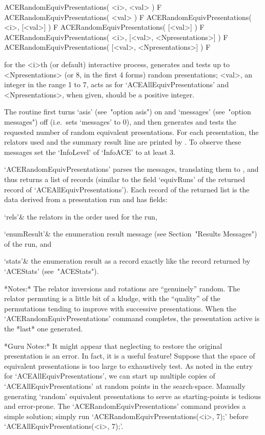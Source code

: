 \>ACERandomEquivPresentations( <i>, <val> ) F
\>ACERandomEquivPresentations( <val> ) F
\>ACERandomEquivPresentations( <i>, [<val>] ) F
\>ACERandomEquivPresentations( [<val>] ) F
\>ACERandomEquivPresentations( <i>, [<val>, <Npresentations>] ) F
\>ACERandomEquivPresentations( [<val>, <Npresentations>] ) F

for the <i>th (or default) interactive {\ACE} process,  generates  and
tests up to <Npresentations> (or 8,  in  the  first  4  forms)  random
presentations; <val>, an integer in the range 1  to  7,  acts  as  for
`ACEAllEquivPresentations' and <Npresentations>, when given, should be
a positive integer.

The routine first turns `asis' (see~"option asis") on  and  `messages'
(see~"option messages") off (i.e.~sets  `messages'  to  0),  and  then
generates  and  tests  the  requested  number  of  random   equivalent
presentations. For  each  presentation,  the  relators  used  and  the
summary result line are printed by {\ACE}. To observe  these  messages
set the `InfoLevel' of `InfoACE' to at least 3.

`ACERandomEquivPresentations' parses the {\ACE} messages,  translating
them to {\GAP}, and thus returns a list of  records  (similar  to  the
field     `equivRuns'     of     the      returned      record      of
`ACEAllEquivPresentations'). Each record of the returned list  is  the
data derived from a presentation run and has fields:

\beginitems

\quad`rels'& the relators in the order used for the run,

\quad`enumResult'&  the  {\ACE}  enumeration   result   message   (see
Section~"Results Messages") of the run, and

\quad`stats'& the enumeration result as a {\GAP} record  exactly  like
the record returned by `ACEStats' (see~"ACEStats").

\enditems

*Notes:*
The relator inversions and rotations  are  ``genuinely''  random.  The
relator permuting is a little bit of a kludge, with the ``quality'' of
the permutations tending to  improve  with  successive  presentations.
When  the   `ACERandomEquivPresentations'   command   completes,   the
presentation active is the *last* one generated.

*Guru Notes:*
It might appear that neglecting to restore the  original  presentation
is an error. In fact, it is a useful feature! Suppose that  the  space
of equivalent presentations is too  large  to  exhaustively  test.  As
noted in the entry for `ACEAllEquivPresentations',  we  can  start  up
multiple copies of `ACEAllEquivPresentations' at random points in  the
search-space. Manually generating `random' equivalent presentations to
serve   as   starting-points   is   tedious   and   error-prone.   The
`ACERandomEquivPresentations'  command  provides  a  simple  solution;
simply    run    `ACERandomEquivPresentations(<i>,     7);'     before
`ACEAllEquivPresentations(<i>, 7);'.

